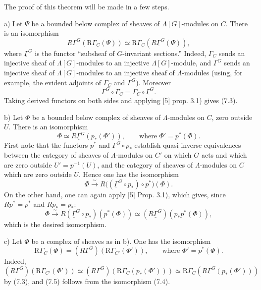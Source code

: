 \documentclass[11pt]{article}
\providecommand{\RG}{\mathrm R\Gamma}
\begin{document}
The proof of this theorem will be made in a few steps.

a) Let $\Psi$ be a bounded below complex of sheaves of $\Lambda[G]$-modules on $C$. There is an isomorphism
\[
R\Gamma^G(\RG_C(\Psi))\simeq\RG_C(R\underline{\Gamma}^G(\Psi)),
\tag{7.3}
\]
where $\underline{\Gamma}^G$ is the functor ``subsheaf of $G$-invariant sections.'' Indeed, $\Gamma_C$ sends an injective sheaf of $\Lambda[G]$-modules to an injective $\Lambda[G]$-module, and $\Gamma^G$ sends an injective sheaf of $\Lambda[G]$-modules to an injective sheaf of $\Lambda$-modules (using, for example, the evident adjoints of $\Gamma_C$ and $\Gamma^G$). Moreover
\[
\Gamma^G\circ\Gamma_C=\Gamma_C\circ\underline{\Gamma}^G.
\]
Taking derived functors on both sides and applying [5] prop. 3.1) gives (7.3).

b) Let $\Phi$ be a bounded below complex of sheaves of $\Lambda$-modules on $C$, zero outside $U$. There is an isomorphism
\[
\Phi\simeq R\underline{\Gamma}^G(p_*(\Phi')),
\qquad\text{where } \Phi'=p^*(\Phi).
\tag{7.4}
\]
First note that the functors $p^*$ and $\underline{\Gamma}^G\circ p_*$ establish quasi-inverse equivalences between the category of sheaves of $\Lambda$-modules on $C'$ on which $G$ acts and which are zero outside $U'=p^{-1}(U)$, and the category of sheaves of $\Lambda$-modules on $C$ which are zero outside $U$. Hence one has the isomorphism
\[
\Phi\xrightarrow{\sim} R\bigl((\underline{\Gamma}^G\circ p_*)\circ p^*\bigr)(\Phi).
\]
On the other hand, one can again apply [5] Prop. 3.1), which gives, since $Rp^*=p^*$ and $Rp_*=p_*$:
\[
\Phi\xrightarrow{\sim} R(\underline{\Gamma}^G\circ p_*)(p^*(\Phi))
\simeq (R\underline{\Gamma}^G)(p_*p^*(\Phi)),
\]
which is the desired isomorphism.

c) Let $\Phi$ be a complex of sheaves as in b). One has the isomorphism
\[
\RG_C(\Phi)=(R\Gamma^G)(\RG_{C'}(\Phi')),
\qquad\text{where } \Phi'=p^*(\Phi).
\tag{7.5}
\]
Indeed,
\[
(R\Gamma^G)(\RG_{C'}(\Phi'))
\simeq
(R\Gamma^G)(\RG_C(p_*(\Phi')))
\simeq
\RG_C(R\underline{\Gamma}^G(p_*(\Phi')))
\]
by (7.3), and (7.5) follows from the isomorphism (7.4).
\end{document}
